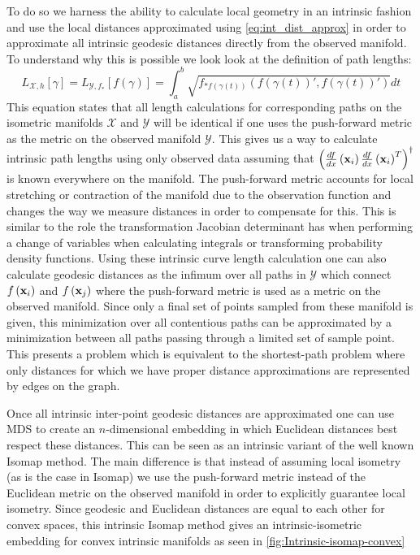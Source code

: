 	To do so we harness the ability to calculate local geometry in an intrinsic fashion and use the local distances approximated using \cref{eq:int_dist_approx} in order to approximate all intrinsic geodesic distances directly from the observed manifold. To understand why this is possible we look look at the definition of path lengths:
	\[
	L_{\mathcal{X},h}\left[\gamma\right]=L_{\mathcal{Y},f_{*}}\left[f\left(\gamma\right)\right]=\int_{a}^{b}\sqrt{f_{*f\left(\gamma(t)\right)}\left(f\left(\gamma\left(t\right)\right)',f\left(\gamma\left(t\right)\right)'\right)}dt
	\]	
	This equation states that all length calculations for corresponding paths on the isometric manifolds $\mathcal{X}$ and $\mathcal{Y}$ will be identical if one uses the push-forward metric as the metric on the observed manifold $\mathcal{Y}$. This gives us a way to calculate intrinsic path lengths using only observed data assuming that $\left(\frac{df}{dx}\left({\bf x}_{i}\right)\frac{df}{dx}\left({\bf x}_{i}\right)^{T}\right)^{\dagger}$is known everywhere on the manifold. The push-forward metric accounts for local stretching or contraction of the manifold due to the observation function and changes the way we measure distances in order to compensate for this. This is similar to the role the transformation Jacobian determinant has when performing a change of variables when calculating integrals or transforming probability density functions. Using these intrinsic curve length calculation one can also calculate geodesic distances as the infimum over all paths in $\mathcal{Y}$ which connect $f\left({\bf x}_{i}\right)$ and $f\left({\bf x}_{j}\right)$ where the push-forward metric is used as a metric on the observed manifold. Since only a final set of points sampled from these manifold is given, this minimization over all contentious paths can be approximated by a minimization between all paths passing through a limited set of sample point. This presents a problem which is equivalent to the shortest-path problem where only distances for which we have proper distance approximations are represented by edges on the graph.
	
	Once all intrinsic inter-point geodesic distances are approximated one can use \ac{MDS} to create an $n$-dimensional embedding in which Euclidean distances best respect these distances. This can be seen as an intrinsic variant of the well known Isomap method. The main difference is that instead of assuming local isometry (as is the case in Isomap) we use the push-forward metric instead of the Euclidean metric on the observed manifold in order to explicitly guarantee local isometry. Since geodesic and Euclidean distances are equal to each other for convex spaces, this intrinsic Isomap method gives an intrinsic-isometric embedding for convex intrinsic manifolds as seen in \cref{fig:Intrinsic-isomap-convex}
	
